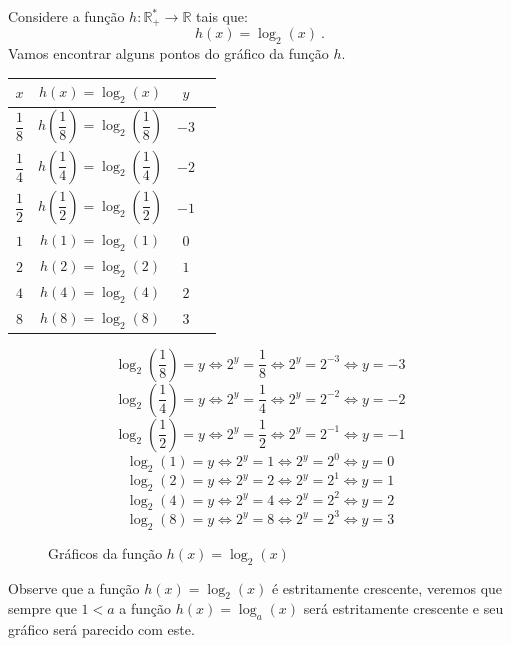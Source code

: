  \begin{exem} \label{ex:log-2}
  Considere a função $h: \mathbb{R_{+}^{*}} \rightarrow \mathbb{R} $ tais que:
 \[h(x) = \log_{2}(x) \ .\]
 Vamos encontrar alguns pontos do gráfico da função $h$.

  \begin{table}[H]
 \centering
 \begin{tabular}{|c|c|c|c|} \hline
 \rowcolor{cinza}
 $x$ & $h(x) = \log_{2}(x)$ & $y$ \\ \hline
 $\dfrac{1}{8}$ & $h\left(\dfrac{1}{8}\right)= \log_{2}\left(\dfrac{1}{8}\right)$ & $-3$ \\ \hline
 $\dfrac{1}{4}$ & $h\left(\dfrac{1}{4}\right)= \log_{2}\left(\dfrac{1}{4}\right)$ & $-2$ \\ \hline
 $\dfrac{1}{2}$ & $h\left(\dfrac{1}{2}\right)= \log_{2}\left(\dfrac{1}{2}\right)$ & $-1$ \\ \hline
 $1$ & $h(1)= \log_{2}(1)$ & $0$ \\ \hline
 $2$ & $h(2)= \log_{2}(2)$ & $1$ \\ \hline
 $4$ & $h(4)= \log_{2}(4)$ & $2$ \\ \hline
 $8$ & $h(8)= \log_{2}(8)$ & $3$ \\ \hline
 \end{tabular}
 \end{table}

 \[\log_{2}\left(\dfrac{1}{8}\right)= y \Leftrightarrow 2^y= \dfrac{1}{8} \Leftrightarrow 2^y= 2^{-3} \Leftrightarrow y=-3\]
 \[\log_{2}\left(\dfrac{1}{4}\right)= y \Leftrightarrow 2^y= \dfrac{1}{4} \Leftrightarrow 2^y= 2^{-2} \Leftrightarrow y=-2\]
 \[\log_{2}\left(\dfrac{1}{2}\right)= y \Leftrightarrow 2^y= \dfrac{1}{2} \Leftrightarrow 2^y= 2^{-1} \Leftrightarrow y=-1\]
 \[\log_{2}(1)= y \Leftrightarrow 2^y= 1 \Leftrightarrow 2^y= 2^0 \Leftrightarrow y=0\]
 \[\log_{2}(2)= y \Leftrightarrow 2^y= 2 \Leftrightarrow 2^y= 2^1 \Leftrightarrow y=1\]
 \[\log_{2}(4)= y \Leftrightarrow 2^y= 4 \Leftrightarrow 2^y= 2^2 \Leftrightarrow y=2\]
 \[\log_{2}(8)= y \Leftrightarrow 2^y= 8 \Leftrightarrow 2^y= 2^3 \Leftrightarrow y=3\]

 \begin{figure}[H]
    \centering
    \caption{Gráficos da função $h(x)= \log_{2}(x)$}
   \end{figure}
 Observe que a função $h(x)= \log_{2}(x)$ é estritamente crescente, veremos que sempre que $1< a$ a função $h(x)= \log_{a}(x)$ será estritamente crescente e seu gráfico será parecido com este.
 \end{exem}


